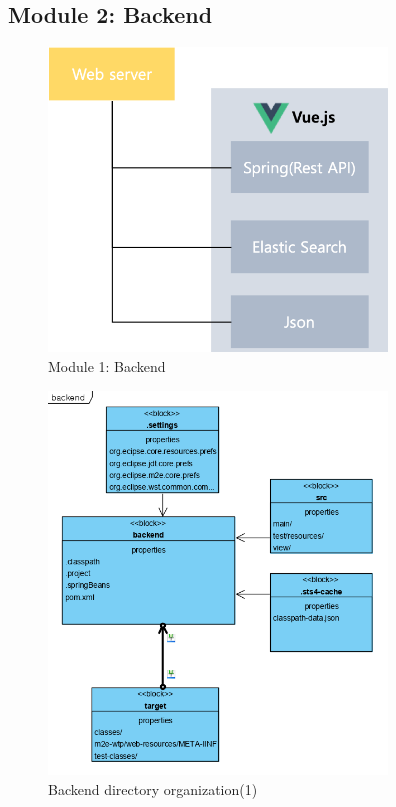 \documentclass[conference]{IEEEtran}
\begin{document}
  \subsection{Module 2: Backend}
\begin{figure}[htbp]
\centerline{\includegraphics[width=90mm,scale=0.5]{fig/6_6.png}}
\caption{Module 1: Backend}
\label{fig}
\end{figure}


\begin{figure}[htbp]
\centerline{\includegraphics[width=90mm,scale=0.5]{fig/backend1.png}}
\caption{Backend directory organization(1)}
\label{fig}
\end{figure}
\end{document}

